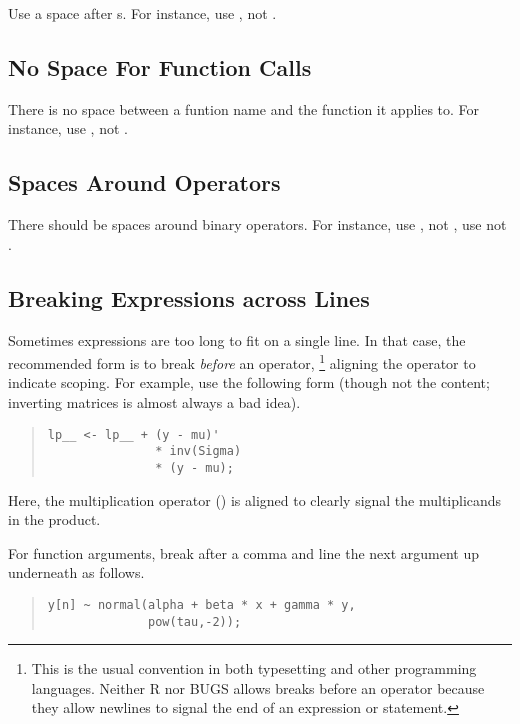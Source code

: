 Use a space after s.  For instance, use , not
.

\subsection{No Space For Function Calls}

There is no space between a funtion name and the function it applies
to.  For instance, use , not .

\subsection{Spaces Around Operators}

There should be spaces around binary operators.  For instance, use
, not , use  not
.

\subsection{Breaking Expressions across Lines}

Sometimes expressions are too long to fit on a single line.  In that
case, the recommended form is to break \emph{before} an operator,%
%
\footnote{This is the usual convention in both typesetting and other
  programming languages. Neither R nor BUGS allows breaks before an
  operator because they allow newlines to signal the end of an
  expression or statement.}
%
aligning the operator to indicate scoping.  For example, use the
following form (though not the content; inverting matrices is almost
always a bad idea).
%
\begin{quote}
\begin{Verbatim}
lp__ <- lp__ + (y - mu)'
               * inv(Sigma) 
               * (y - mu);
\end{Verbatim}
\end{quote}
%
Here, the multiplication operator (\code{*}) is aligned to clearly
signal the multiplicands in the product.  

For function arguments, break after a comma and line the next
argument up underneath as follows.
%
\begin{quote}
\begin{Verbatim}
y[n] ~ normal(alpha + beta * x + gamma * y,
              pow(tau,-2));
\end{Verbatim}
\end{quote}
%

